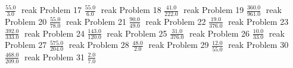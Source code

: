 \documentclass{article}
\begin{document}
\hfill \break
$\displaystyle \frac{55.0}{3.0}$
\newline
\hfill reak
Problem 17
\newline
\hfill \break
$\displaystyle \frac{55.0}{6.0}$
\newline
\hfill reak
Problem 18
\newline
\hfill \break
$\displaystyle \frac{41.0}{222.0}$
\newline
\hfill reak
Problem 19
\newline
\hfill \break
$\displaystyle \frac{360.0}{961.0}$
\newline
\hfill reak
Problem 20
\newline
\hfill \break
$\displaystyle \frac{55.0}{78.0}$
\newline
\hfill reak
Problem 21
\newline
\hfill \break
$\displaystyle \frac{90.0}{49.0}$
\newline
\hfill reak
Problem 22
\newline
\hfill \break
$\displaystyle \frac{19.0}{376.0}$
\newline
\hfill reak
Problem 23
\newline
\hfill \break
$\displaystyle \frac{392.0}{333.0}$
\newline
\hfill reak
Problem 24
\newline
\hfill \break
$\displaystyle \frac{143.0}{120.0}$
\newline
\hfill reak
Problem 25
\newline
\hfill \break
$\displaystyle \frac{31.0}{376.0}$
\newline
\hfill reak
Problem 26
\newline
\hfill \break
$\displaystyle \frac{10.0}{33.0}$
\newline
\hfill reak
Problem 27
\newline
\hfill \break
$\displaystyle \frac{575.0}{204.0}$
\newline
\hfill reak
Problem 28
\newline
\hfill \break
$\displaystyle \frac{48.0}{2.0}$
\newline
\hfill reak
Problem 29
\newline
\hfill \break
$\displaystyle \frac{12.0}{55.0}$
\newline
\hfill reak
Problem 30
\newline
\hfill \break
$\displaystyle \frac{468.0}{209.0}$
\newline
\hfill reak
Problem 31
\newline
\hfill \break
$\displaystyle \frac{2.0}{7.0}$
\end{document}
